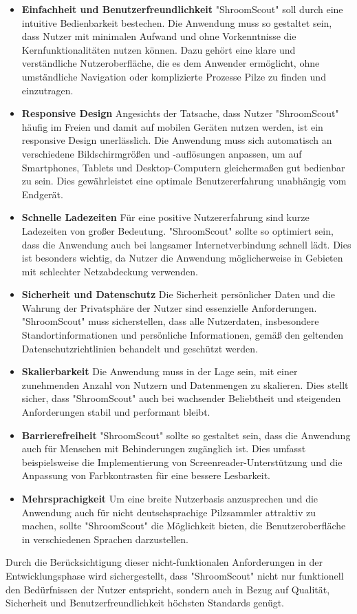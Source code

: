 \documentclass[../main.tex]{subfiles}
\begin{document}
\begin{itemize}
  
  \item \textbf{Einfachheit und Benutzerfreundlichkeit}
  "ShroomScout" soll durch eine intuitive Bedienbarkeit bestechen. Die Anwendung muss so gestaltet sein, dass Nutzer mit 
  minimalen Aufwand und ohne Vorkenntnisse die Kernfunktionalitäten nutzen können. Dazu gehört eine klare und verständliche 
  Nutzeroberfläche, die es dem Anwender ermöglicht, ohne umständliche Navigation oder komplizierte Prozesse Pilze zu finden 
  und einzutragen.

  \item \textbf{Responsive Design}
  Angesichts der Tatsache, dass Nutzer "ShroomScout" häufig im Freien und damit auf mobilen Geräten nutzen werden, ist ein 
  responsive Design unerlässlich. Die Anwendung muss sich automatisch an verschiedene Bildschirmgrößen und -auflösungen 
  anpassen, um auf Smartphones, Tablets und Desktop-Computern gleichermaßen gut bedienbar zu sein. Dies gewährleistet eine 
  optimale Benutzererfahrung unabhängig vom Endgerät.

  \item \textbf{Schnelle Ladezeiten}
  Für eine positive Nutzererfahrung sind kurze Ladezeiten von großer Bedeutung. "ShroomScout" sollte so optimiert sein, 
  dass die Anwendung auch bei langsamer Internetverbindung schnell lädt. Dies ist besonders wichtig, da Nutzer die Anwendung 
  möglicherweise in Gebieten mit schlechter Netzabdeckung verwenden.

  \item \textbf{Sicherheit und Datenschutz}
  Die Sicherheit persönlicher Daten und die Wahrung der Privatsphäre der Nutzer sind essenzielle Anforderungen. "ShroomScout" 
  muss sicherstellen, dass alle Nutzerdaten, insbesondere Standortinformationen und persönliche Informationen, gemäß den 
  geltenden Datenschutzrichtlinien behandelt und geschützt werden.

  \item \textbf{Skalierbarkeit}
  Die Anwendung muss in der Lage sein, mit einer zunehmenden Anzahl von Nutzern und Datenmengen zu skalieren. Dies stellt 
  sicher, dass "ShroomScout" auch bei wachsender Beliebtheit und steigenden Anforderungen stabil und performant bleibt.

  \item \textbf{Barrierefreiheit}
  "ShroomScout" sollte so gestaltet sein, dass die Anwendung auch für Menschen mit Behinderungen zugänglich ist. Dies 
  umfasst beispielsweise die Implementierung von Screenreader-Unterstützung und die Anpassung von Farbkontrasten für eine 
  bessere Lesbarkeit.

  \item \textbf{Mehrsprachigkeit}
  Um eine breite Nutzerbasis anzusprechen und die Anwendung auch für nicht deutschsprachige Pilzsammler attraktiv zu machen, 
  sollte "ShroomScout" die Möglichkeit bieten, die Benutzeroberfläche in verschiedenen Sprachen darzustellen.

\end{itemize}

Durch die Berücksichtigung dieser nicht-funktionalen Anforderungen in der Entwicklungsphase wird sichergestellt, dass 
"ShroomScout" nicht nur funktionell den Bedürfnissen der Nutzer entspricht, sondern auch in Bezug auf Qualität, 
Sicherheit und Benutzerfreundlichkeit höchsten Standards genügt.
\end{document}

